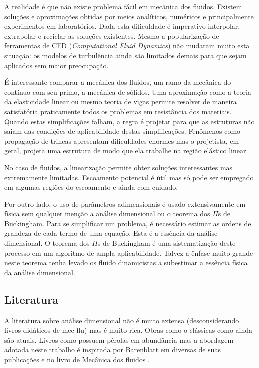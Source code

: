 \documentclass[article,12pt,oneside,a4paper,english,brazil,sumario=tradicional]{abntex2}
\begin{document}
A realidade é que não existe problema fácil em mecânica dos fluidos. Existem soluções e aproximações obtidas por meios analíticos, numéricos e principalmente experimentos em laboratórios. Dada esta dificuldade é imperativo interpolar, extrapolar e reciclar as soluções existentes. Mesmo a popularização de ferramentas de CFD (\emph{Computational Fluid Dynamics}) não mudaram muito esta situação: os modelos de turbulência ainda são limitados demais para que sejam aplicados sem maior preocupação.

É interessante comparar a mecânica dos fluidos, um ramo da mecânica do contínuo com seu primo, a mecânica de sólidos. Uma aproximação como a teoria da elasticidade linear ou mesmo teoria de vigas permite resolver de maneira satisfatória praticamente todos os problemas em resistância dos materiais. Quando estas simplificações falham, a regra é projetar para que as estruturas não saiam das condições de aplicabilidade destas simplificações. Fenômenos como propagação de trincas apresentam dificuldades enormes mas o projetista, em geral, projeta uma estrutura de modo que ela trabalhe na região elástico linear.

No caso de fluidos, a linearização permite obter soluções interessantes mas extremamente limitadas. Escoamento potencial é útil mas só pode ser empregado em algumas regiões do escoamento e ainda com cuidado.

Por outro lado, o uso de parâmetros adimensionais é usado extensivamente em física sem qualquer menção a análise dimensional ou o teorema dos $\Pi$s de Buckingham. Para se simplificar um problema, é necessário estimar as ordens de grandeza de cada termo de uma equação. Esta é a essência da análise dimensional. O teorema dos $\Pi$s de Buckingham é uma sistematização deste processo em um algoritmo de ampla aplicabilidade. Talvez a ênfase muito grande neste teorema tenha levado os fluido dinamicistas a subestimar a essência física da análise dimensional.

\subsection{Literatura}
A literatura sobre análise dimensional não é muito extensa (desconsiderando livros didáticos de mec-flu) mas é muito rica. Obras como o clássicas como   ainda são atuais. Livros como  possuem pérolas em abundância mas a abordagem adotada neste trabalho é inspirada por Barenblatt em diversas de suas publicações \cite{Barenblatt03} e no livro de Mecânica dos fluidos .
\end{document}
